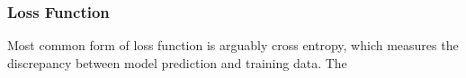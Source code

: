 \subsubsection{Loss Function}

Most common form of loss function is arguably cross entropy, which measures the discrepancy between model prediction and training data. The 